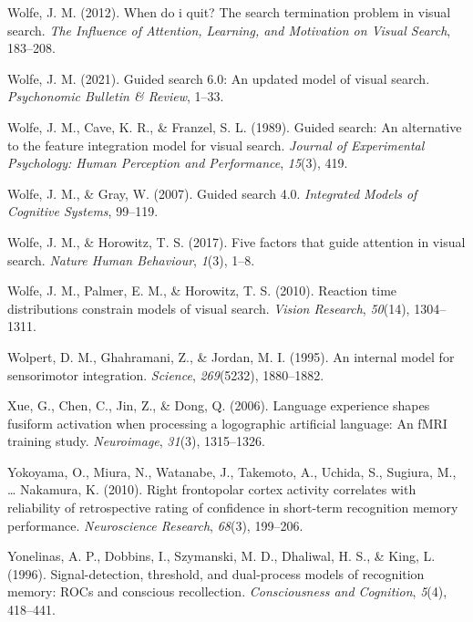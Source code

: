 \documentclass[12pt,twoside]{reedthesis}
\newenvironment{CSLReferences}%
  {}%
  {\par}
\begin{document}
\begin{CSLReferences}{1}{0}
\leavevmode\hypertarget{ref-wolfe2012quit}{}%
Wolfe, J. M. (2012). When do i quit? The search termination problem in visual search. \emph{The Influence of Attention, Learning, and Motivation on Visual Search}, 183--208.

\leavevmode\hypertarget{ref-wolfe2021guided}{}%
Wolfe, J. M. (2021). Guided search 6.0: An updated model of visual search. \emph{Psychonomic Bulletin \& Review}, 1--33.

\leavevmode\hypertarget{ref-wolfe1989guided}{}%
Wolfe, J. M., Cave, K. R., \& Franzel, S. L. (1989). Guided search: An alternative to the feature integration model for visual search. \emph{Journal of Experimental Psychology: Human Perception and Performance}, \emph{15}(3), 419.

\leavevmode\hypertarget{ref-wolfe2007guided}{}%
Wolfe, J. M., \& Gray, W. (2007). Guided search 4.0. \emph{Integrated Models of Cognitive Systems}, 99--119.

\leavevmode\hypertarget{ref-wolfe2017five}{}%
Wolfe, J. M., \& Horowitz, T. S. (2017). Five factors that guide attention in visual search. \emph{Nature Human Behaviour}, \emph{1}(3), 1--8.

\leavevmode\hypertarget{ref-wolfe2010reaction}{}%
Wolfe, J. M., Palmer, E. M., \& Horowitz, T. S. (2010). Reaction time distributions constrain models of visual search. \emph{Vision Research}, \emph{50}(14), 1304--1311.

\leavevmode\hypertarget{ref-wolpert1995internal}{}%
Wolpert, D. M., Ghahramani, Z., \& Jordan, M. I. (1995). An internal model for sensorimotor integration. \emph{Science}, \emph{269}(5232), 1880--1882.

\leavevmode\hypertarget{ref-xue2006language}{}%
Xue, G., Chen, C., Jin, Z., \& Dong, Q. (2006). Language experience shapes fusiform activation when processing a logographic artificial language: An fMRI training study. \emph{Neuroimage}, \emph{31}(3), 1315--1326.

\leavevmode\hypertarget{ref-yokoyama2010right}{}%
Yokoyama, O., Miura, N., Watanabe, J., Takemoto, A., Uchida, S., Sugiura, M., \ldots{} Nakamura, K. (2010). Right frontopolar cortex activity correlates with reliability of retrospective rating of confidence in short-term recognition memory performance. \emph{Neuroscience Research}, \emph{68}(3), 199--206.

\leavevmode\hypertarget{ref-yonelinas1996signal}{}%
Yonelinas, A. P., Dobbins, I., Szymanski, M. D., Dhaliwal, H. S., \& King, L. (1996). Signal-detection, threshold, and dual-process models of recognition memory: ROCs and conscious recollection. \emph{Consciousness and Cognition}, \emph{5}(4), 418--441.


\end{CSLReferences}
\end{document}
